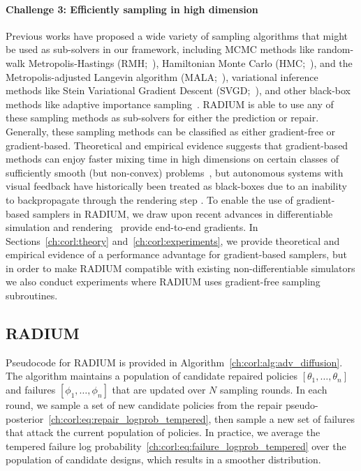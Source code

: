 \paragraph{Challenge 3: Efficiently sampling in high dimension}
%
Previous works have proposed a wide variety of sampling algorithms that might be used as sub-solvers in our framework, including MCMC methods like random-walk Metropolis-Hastings (RMH;~\cite{hastingsMonteCarloSampling1970}), Hamiltonian Monte Carlo (HMC;~\cite{nealMCMCUsingHamiltonian2011}), and the Metropolis-adjusted Langevin algorithm (MALA;~\cite{julianbresagCommentsGrenadierMiller1994}), variational inference methods like Stein Variational Gradient Descent (SVGD;~\cite{liuSteinVariationalGradient2016a}), and other black-box methods like adaptive importance sampling~\cite{okellyScalableEndtoEndAutonomous2018}. RADIUM is able to use any of these sampling methods as sub-solvers for either the prediction or repair. Generally, these sampling methods can be classified as either gradient-free or gradient-based. Theoretical and empirical evidence suggests that gradient-based methods can enjoy faster mixing time in high dimensions on certain classes of sufficiently smooth (but non-convex) problems~\cite{maSamplingCanBe2019}, but autonomous systems with visual feedback have historically  been treated as black-boxes due to an inability to backpropagate through the rendering step \cite{zhouRoCUSRobotController2021,okellyScalableEndtoEndAutonomous2018,sinhaNeuralBridgeSampling2020}.
%
To enable the use of gradient-based samplers in RADIUM, we draw upon recent advances in differentiable simulation and rendering~\cite{huDiffTaichiDifferentiableProgramming2019,lelidecDifferentiableRenderingPerturbed2021} provide end-to-end gradients. In Sections~\ref{ch:corl:theory} and~\ref{ch:corl:experiments}, we provide theoretical and empirical evidence of a performance advantage for gradient-based samplers, but in order to make RADIUM compatible with existing non-differentiable simulators we also conduct experiments where RADIUM uses gradient-free sampling subroutines.

\subsection{RADIUM}

Pseudocode for RADIUM is provided in Algorithm~\ref{ch:corl:alg:adv_diffusion}. The algorithm maintains a population of candidate repaired policies $[\theta_1, \ldots, \theta_n]$ and failures $[\phi_1, \ldots, \phi_n]$ that are updated over $N$ sampling rounds. In each round, we sample a set of new candidate policies from the repair pseudo-posterior~\eqref{ch:corl:eq:repair_logprob_tempered}, then sample a new set of failures that attack the current population of policies. In practice, we average the tempered failure log probability~\eqref{ch:corl:eq:failure_logprob_tempered} over the population of candidate designs, which results in a smoother distribution.

